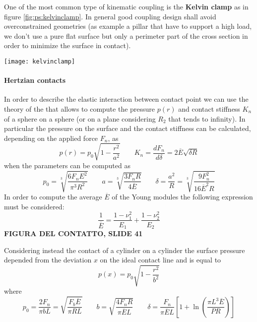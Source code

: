 		One of the most common type of kinematic coupling is the \textbf{Kelvin clamp} as in figure \ref{fig:ps:kelvinclamp}. In general good coupling design shall avoid overconstrained geometries (as example a pillar that have to support a high load, we don't use a pure flat surface but only a perimeter part of the cross section in order to minimize the surface in contact).
		
		\begin{SCfigure}[2][bht]
			\centering
			\texttt{[image: kelvinclamp]}
			\caption{Kelvin clamp of type I (on the left) and type II (right).} 
			\label{fig:ps:kelvinclamp}
		\end{SCfigure}
		
		\paragraph{Hertzian contacts} In order to describe the elastic interaction between contact point we can use the theory of the  that allows to compute the pressure $p(r)$ and contact stiffness $K_n$ of a sphere on a sphere (or on a plane considering $R_2$ that tends to infinity). In particular the pressure on the surface and the contact stiffness can be calculated, depending on the applied force $F_n$, as
		\begin{equation}
			p(r) = p_0 \sqrt{1- \frac{r^2}{a^2}} \qquad K_n = \frac{dF_n}{d\delta} = 2\overline E \sqrt{\delta R}
		\end{equation}
		when the parameters can be computed as
		\[ p_0 = \sqrt[3]{\frac{6 F_n E^2}{\pi^3 R^2}} \qquad a = \sqrt[3]{\frac{3F_n R}{4\overline E}} \qquad \delta = \frac{a^2}{R} = \sqrt[3]{ \frac{9F_n^2}{16\overline E^2 R} } \]
		In order to compute the average $\overline E$ of the Young modules the following expression must be considered:
		\[\frac 1 {\overline E} = \frac{1-\nu_1^2}{E_1} + \frac{1-\nu_2^2}{E_2} \]
		\textbf{FIGURA DEL CONTATTO, SLIDE 41}
		
		Considering instead the contact of a cylinder on a cylinder the surface pressure depended from the deviation $x$ on the ideal contact line and is equal to
		\begin{equation}
			p(x) = p_0 \sqrt{1- \frac{r^2}{b^2}}
		\end{equation}
		where
		\[ p_0 = \frac{2F_n}{\pi b L } = \sqrt{\frac{F_b\overline E}{\pi RL}} \qquad b = \sqrt{\frac{4F_nR}{\pi \overline E L}} \qquad \delta = \frac{F_n}{\pi \overline E L} \left[ 1 + \ln \left(\frac{\pi L^3\overline E}{PR}\right) \right] \]
	
